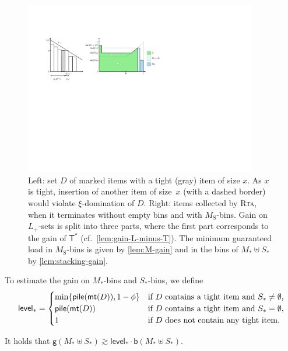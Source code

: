 \documentclass[a4paper,USenglish,cleveref]{lipics-v2019}
\newcommand{\M}{\ensuremath{M_\mathrm{S}}\xspace}
\newcommand{\ST}{\ensuremath{S_*}\xspace}
\newcommand{\MT}{\ensuremath{M_*}\xspace}
\newcommand{\LT}{\ensuremath{L_+}\xspace}
\newcommand{\D}{\ensuremath{D}\xspace}
\newcommand{\smallBoundary}{\ensuremath{\phi}}
\newcommand{\g}{\ensuremath{\xi}}
\newcommand{\B}{\textsf{b}}
\newcommand{\gain}{\textsf{g}}
\newcommand{\stack}{\textsf{pile}}
\newcommand{\level}{\textsf{level}_*}
\newcommand{\mt}{\textsf{mt}(\D)}
\newcommand{\T}{\textsf{T}}
\newcommand{\Tmax}{\T^*}
\newcommand{\ALG}{\textsc{Rta}\xspace}
\begin{document}

\begin{figure}[t]
\centering
\includegraphics[width=0.9\textwidth]{images/tight-sets.pdf}
\caption{Left: set $\D$ of marked items with a tight (gray) item of size $x$. As
$x$ is tight, insertion of another item of size~$x$ (with a dashed border) would
violate $\g$-domination of $\D$. Right: items collected by \ALG, when it
terminates without empty bins and with $\M$-bins. Gain on $\LT$-sets is split
into three parts, where the first part corresponds to the gain of $\Tmax$
(cf.~\cref{lem:gain-L-minus-T}). The minimum guaranteed load 
in $\M$-bins is given by \cref{lem:M-gain} and in the bins of $\MT
\uplus \ST$ by \cref{lem:stacking-gain}.}
\label{fig:tightness}
\end{figure}

To estimate the gain on \MT-bins and \ST-bins, we define
\begin{equation}
\label{eq:level-def}
  \level = \begin{cases}
  \min\{ \stack(\mt), 1-\smallBoundary \} & \text{if \D contains a tight item and $\ST \neq \emptyset$,} \\
  \stack(\mt) & \text{if \D contains a tight item and $\ST = \emptyset$,} \\
  1 & \text{if \D does not contain any tight item.}
\end{cases}
\end{equation}


\begin{lemma}
\label{lem:stacking-gain}
It holds that
$\gain(\MT \uplus \ST) \gtrsim \level \cdot \B(\MT \uplus \ST)$.
\end{lemma}
\end{document}
